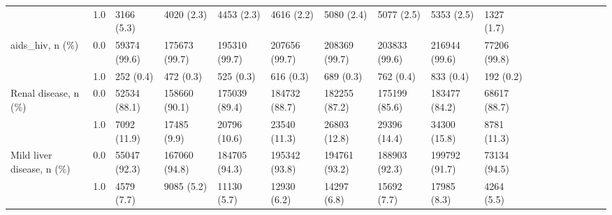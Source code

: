 \begin{tabular}{llllllllllllllllll}
                                       & 1.0 &                   3166 (5.3) &      4020 (2.3) &      4453 (2.3) &      4616 (2.2) &      5080 (2.4) &      5077 (2.5) &      5353 (2.5) &     1327 (1.7) &                   &                    &                    &                    &                    &                     &                     &                     \\
aids\_hiv, n (\%) & 0.0 &                 59374 (99.6) &   175673 (99.7) &   195310 (99.7) &   207656 (99.7) &   208369 (99.7) &   203833 (99.6) &   216944 (99.6) &   77206 (99.8) &                   &                    &                    &                    &                    &                     &                     &                     \\
                                       & 1.0 &                    252 (0.4) &       472 (0.3) &       525 (0.3) &       616 (0.3) &       689 (0.3) &       762 (0.4) &       833 (0.4) &      192 (0.2) &                   &                    &                    &                    &                    &                     &                     &                     \\
Renal disease, n (\%) & 0.0 &                 52534 (88.1) &   158660 (90.1) &   175039 (89.4) &   184732 (88.7) &   182255 (87.2) &   175199 (85.6) &   183477 (84.2) &   68617 (88.7) &                   &                    &                    &                    &                    &                     &                     &                     \\
                                       & 1.0 &                  7092 (11.9) &     17485 (9.9) &    20796 (10.6) &    23540 (11.3) &    26803 (12.8) &    29396 (14.4) &    34300 (15.8) &    8781 (11.3) &                   &                    &                    &                    &                    &                     &                     &                     \\
Mild liver disease, n (\%) & 0.0 &                 55047 (92.3) &   167060 (94.8) &   184705 (94.3) &   195342 (93.8) &   194761 (93.2) &   188903 (92.3) &   199792 (91.7) &   73134 (94.5) &                   &                    &                    &                    &                    &                     &                     &                     \\
                                       & 1.0 &                   4579 (7.7) &      9085 (5.2) &     11130 (5.7) &     12930 (6.2) &     14297 (6.8) &     15692 (7.7) &     17985 (8.3) &     4264 (5.5) &                   &                    &                    &                    &                    &                     &                     &                     \\

\end{tabular}
